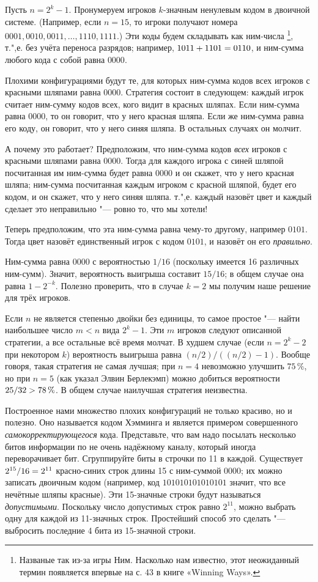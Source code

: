 \documentclass[twoside]{book}
\begin{document}
Пусть $n=2^k-1$.
Пронумеруем игроков $k$-значным ненулевым кодом в двоичной системе.
(Например, если $n=15$, то игроки получают номера $0001,0010,0011,\dots,1110,1111$.)
Эти коды будем складывать как ним-числа%
\footnote{Названые так из-за игры Ним.
Насколько нам известно, этот неожиданный термин появляется впервые на с. 43 в книге «Winning Ways».}, т.",е. без учёта переноса разрядов;
например, $1011 \z+ 1101 =0110$, и ним-сумма любого кода с собой равна $0000$.

Плохими конфигурациями будут те, для которых ним-сумма кодов всех игроков с красными шляпами равна $0000$.
Стратегия состоит в следующем:
каждый игрок считает ним-сумму кодов всех, кого видит в красных шляпах.
Если ним-сумма равна $0000$, то он говорит, что у него красная шляпа.
Если же ним-сумма равна его коду, он говорит, что у него синяя шляпа.
В остальных случаях он молчит.

А почему это работает?
Предположим, что ним-сумма кодов \emph{всех} игроков с красными шляпами равна $0000$.
Тогда для каждого игрока с синей шляпой посчитанная им ним-сумма будет равна $0000$ и он скажет, что у него красная шляпа;
ним-сумма посчитанная каждым игроком с красной шляпой, будет его кодом, и он скажет, что у него синяя шляпа.
т.",е. каждый назовёт цвет и каждый сделает это неправильно "--- ровно то, что мы хотели!

Теперь  предположим, что эта ним-сумма равна чему-то другому, например $0101$.
Тогда цвет назовёт единственный игрок с кодом  $0101$, и назовёт он его \emph{правильно}.

Ним-сумма равна $0000$ с вероятностью $1/16$ (поскольку имеется 16 различных ним-сумм).
Значит, вероятность выигрыша составит $15/16$;
в общем случае она равна $1-2^{-k}$.
Полезно проверить, что в случае $k=2$ мы получим наше решение для трёх игроков.

Если $n$ не является степенью двойки без единицы, то самое простое "--- найти наибольшее число $m<n$ вида $2^k-1$.
Эти $m$ игроков следуют описанной стратегии, а все остальные всё время молчат.
В худшем случае (если $n=2^k-2$ при некотором $k$) вероятность выигрыша равна $(n/2)/((n/2)-1)$.
Вообще говоря, такая стратегия не самая лучшая;
при $n=4$ невозможно улучшить $75\,\%$, но при $n=5$ (как указал Элвин Берлекэмп) можно добиться вероятности $25/32\z>78\,\%$.
В общем случае наилучшая стратегия неизвестна.
\heart

Построенное нами множество плохих конфигураций не только красиво, но и полезно.
Оно называется кодом Хэмминга и является примером совершенного \emph{самокорректирующегося} кода.
Представьте, что вам надо посылать несколько битов информации по не очень надёжному каналу, который иногда переворачивает бит.
Сгруппируйте биты в строчки по 11 в каждой.
Существует $2^{15}/16\z=2^{11}$ красно-синих строк длины 15 с ним-суммой $0000$;
их можно записать двоичным кодом (например, код $101010101010101$ значит, что все нечётные шляпы красные).
Эти 15-значные строки будут называться \emph{допустимыми}.
Поскольку число допустимых строк равно $2^{11}$, можно выбрать одну для каждой из 11-значных строк.
Простейший способ это сделать "--- выбросить последние 4 бита из 15-значной строки.
\end{document}
